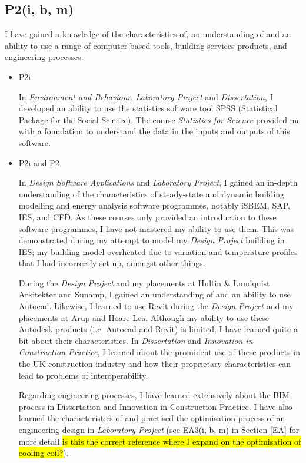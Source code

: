\subsection*{P2(i, b, m)}

I have gained a knowledge of the characteristics of, an understanding of and an ability to use a range of computer-based tools, building services products, and engineering processes:
\begin{itemize}
    \item P2i 
     
     In \textit{Environment and Behaviour}, \textit{Laboratory Project} and \textit{Dissertation}, I developed an ability to use the statistics software tool SPSS (Statistical Package for the Social Science).
     The course \textit{Statistics for Science} provided me with a foundation to understand the data in the inputs and outputs of this software.
    
    \item P2i and P2
    
    In \textit{Design Software Applications} and \textit{Laboratory Project}, I gained an in-depth understanding of the characteristics of steady-state and dynamic building modelling and energy analysis software programmes, notably iSBEM, SAP, IES, and CFD.
    As these courses only provided an introduction to these software programmes, I have not mastered my ability to use them.
    This was demonstrated during my attempt to model my \textit{Design Project} building in IES; my building model overheated due to variation and temperature profiles that I had incorrectly set up, amongst other things.
    
    During the \textit{Design Project} and my placements at Hultin \& Lundquist Arkitekter and Sunamp, I gained an understanding of and an ability to use Autocad.
    Likewise, I learned to use Revit during the \textit{Design Project} and my placements at Arup and Hoare Lea.
    Although my ability to use these Autodesk products (i.e. Autocad and Revit) is limited, I have learned quite a bit about their characteristics.
    In \textit{Dissertation} and \textit{Innovation in Construction Practice}, I learned about the prominent use of these products in the UK construction industry and how their proprietary characteristics can lead to problems of interoperability.
    
    Regarding engineering processes, I have learned extensively about the BIM process in Dissertation and Innovation in Construction Practice.
    I have also learned the characteristics of and practised the optimisation process of an engineering design in \textit{Laboratory Project} (see EA3(i, b, m) in Section \ref{EA} for more detail \hl{is this the correct reference where I expand on the optimisation of cooling coil?}).
    

\end{itemize}
